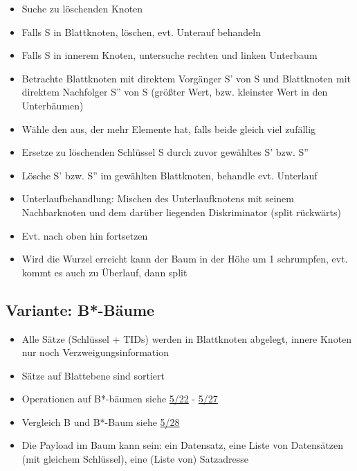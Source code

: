 \documentclass[a4paper, 12pt]{scrartcl}
\begin{document}
\begin{itemize}
\begin{itemize}
			\item
				Suche zu löschenden Knoten
			\item
				Falls S in Blattknoten, löschen, evt. Unterauf behandeln
			\item Falls S in innerem Knoten, untersuche rechten und linken Unterbaum
			\item
				Betrachte Blattknoten mit direktem Vorgänger S' von S und Blattknoten mit direktem Nachfolger S'' von S (größter Wert, bzw. kleinster Wert in den Unterbäumen)
			\item
				Wähle den aus, der mehr Elemente hat, falls beide gleich viel zufällig
			\item
				Ersetze zu löschenden Schlüssel S durch zuvor gewähltes S' bzw. S''
			\item
				Lösche S' bzw. S'' im gewählten Blattknoten, behandle evt. Unterlauf
			\item
				Unterlaufbehandlung: Mischen des Unterlaufknotens mit seinem Nachbarknoten und dem darüber liegenden Diskriminator (split rückwärts)
			\item
				Evt. nach oben hin fortsetzen
			\item
				Wird die Wurzel erreicht kann der Baum in der Höhe um 1 schrumpfen, evt. kommt es auch zu Überlauf, dann split
		\end{itemize}


\end{itemize}
\subsection{Variante: B*-Bäume}
\begin{itemize}
	\item
		Alle Sätze (Schlüssel + TIDs) werden in Blattknoten abgelegt, innere Knoten nur noch Verzweigungsinformation
	\item
		Sätze auf Blattebene sind sortiert
	\item
		Operationen auf B*-bäumen siehe \href{run:IDB-2015WS-05-Schluessel-Teil-2.pdf}{5/22} - \href{run:IDB-2015WS-05-Schluessel-Teil-2.pdf}{5/27}
	\item Vergleich B und B*-Baum siehe \href{run:IDB-2015WS-05-Schluessel-Teil-2.pdf}{5/28}
	\item
		Die Payload im Baum kann sein: ein Datensatz, eine Liste von Datensätzen (mit gleichem Schlüssel), eine (Liste von) Satzadresse
\end{itemize}
\end{document}

